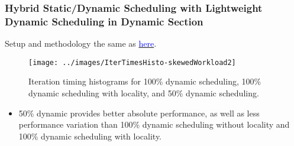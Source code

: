 \begin{frame}
\frametitle{Hybrid Static/Dynamic Scheduling with Lightweight Dynamic Scheduling in Dynamic Section}
{\tiny Setup and methodology the same as \hyperlink{perfVar}{\textcolor{blue}{here}}.} 
\begin{figure}[h!]
\label{fig:skewed2}
\begin{center}
\texttt{[image: ../images/IterTimesHisto-skewedWorkload2]}
\end{center}
\caption{\label{fig:skewed2} Iteration timing histograms for 100\% dynamic scheduling, 100\% dynamic scheduling with locality, and 50\% dynamic scheduling.}
\end{figure}
\begin{itemize}
\tiny \item \tiny 50\% dynamic provides better absolute performance,
as well as less performance variation than 100\% dynamic scheduling
without locality and 100\% dynamic scheduling with locality. 
\end{itemize}
\end{frame}

